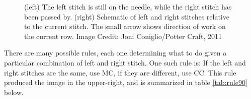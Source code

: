 \documentclass{../knittingpattern}
\begin{document}
\begin{figure}[h]
\begin{center}
\hspace{3em}
\end{center}

\caption{\label{fig:left-right-stitch}(left) The left stitch is still on the needle, while the right stitch has been passed by. (right) Schematic of left and right stitches relative to the current stitch. The small arrow shows direction of work on the current row. Image Credit: Joni Coniglio/Potter Craft, 2011}
\end{figure}

There are many possible rules, each one determining what to do given a particular combination of left and right stitch. One such rule is: If the left and right stitches are the same, use MC, if they are different, use CC. This rule produced the image in the upper-right, and is summarized in table \ref{tab:rule90} below.
\end{document}
